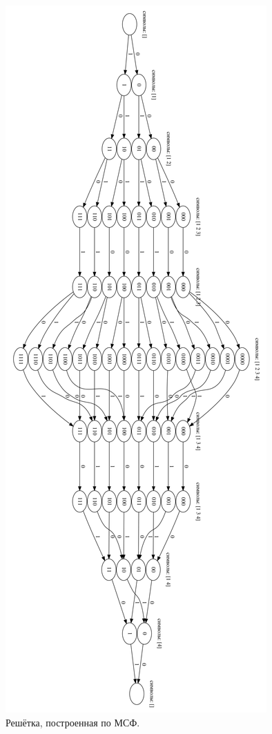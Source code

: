 \documentclass{article}
\begin{document}
\begin{figure}[p]
    \centering
    \includegraphics[height=0.95\textheight]{spen.png}
    \caption{Решётка, построенная по МСФ.}
\end{figure}
\end{document}
